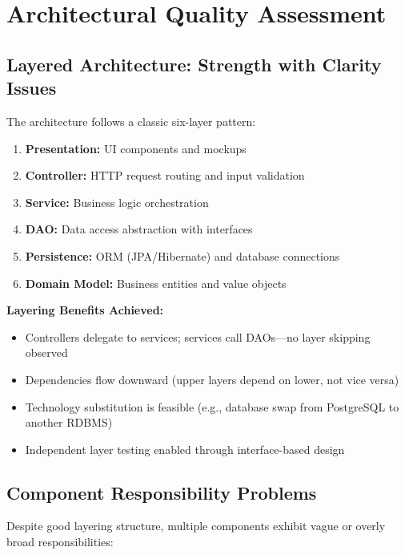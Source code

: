 \documentclass[11pt,a4paper]{article}
\begin{document}
\section{Architectural Quality Assessment}

\subsection{Layered Architecture: Strength with Clarity Issues}

The architecture follows a classic six-layer pattern:

\begin{enumerate}
    \item \textbf{Presentation:} UI components and mockups
    \item \textbf{Controller:} HTTP request routing and input validation
    \item \textbf{Service:} Business logic orchestration
    \item \textbf{DAO:} Data access abstraction with interfaces
    \item \textbf{Persistence:} ORM (JPA/Hibernate) and database connections
    \item \textbf{Domain Model:} Business entities and value objects
\end{enumerate}

\textbf{Layering Benefits Achieved:}
\begin{itemize}
    \item Controllers delegate to services; services call DAOs—no layer skipping observed
    \item Dependencies flow downward (upper layers depend on lower, not vice versa)
    \item Technology substitution is feasible (e.g., database swap from PostgreSQL to another RDBMS)
    \item Independent layer testing enabled through interface-based design
\end{itemize}

\subsection{Component Responsibility Problems}

Despite good layering structure, multiple components exhibit vague or overly broad responsibilities:
\end{document}
